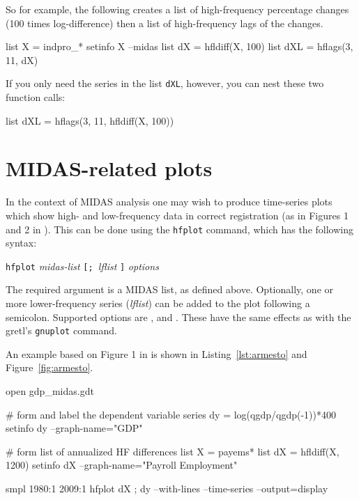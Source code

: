 So for example, the following creates a list of high-frequency
percentage changes (100 times log-difference) then a list of
high-frequency lags of the changes.
%
\begin{code}
list X = indpro_*
setinfo X --midas
list dX = hfldiff(X, 100)
list dXL = hflags(3, 11, dX)
\end{code}

If you only need the series in the list \texttt{dXL}, however, you can
nest these two function calls:
%
\begin{code}
list dXL = hflags(3, 11, hfldiff(X, 100))
\end{code}


\section{MIDAS-related plots}
\label{sec:hfplot}

In the context of MIDAS analysis one may wish to produce time-series
plots which show high- and low-frequency data in correct registration
(as in Figures 1 and 2 in \citealp{armesto10}).  This can be done using
the \texttt{hfplot} command, which has the following syntax:

\texttt{hfplot} \textsl{midas-list} \texttt{[; }\textsl{lflist} 
\texttt{]} \textsl{options}

The required argument is a MIDAS list, as defined above. Optionally,
one or more lower-frequency series (\textsl{lflist}) can be added to
the plot following a semicolon. Supported options are
,  and . These
have the same effects as with the gretl's \texttt{gnuplot} command.

An example based on Figure 1 in \cite{armesto10} is shown in
Listing~\ref{lst:armesto} and Figure~\ref{fig:armesto}.

\begin{script}[p]
  \label{lst:armesto}
\begin{scode}
open gdp_midas.gdt

# form and label the dependent variable
series dy = log(qgdp/qgdp(-1))*400
setinfo dy --graph-name="GDP"

# form list of annualized HF differences
list X = payems*
list dX = hfldiff(X, 1200)
setinfo dX --graph-name="Payroll Employment"

smpl 1980:1 2009:1
hfplot dX ; dy --with-lines --time-series --output=display
\end{scode}
\end{script}

